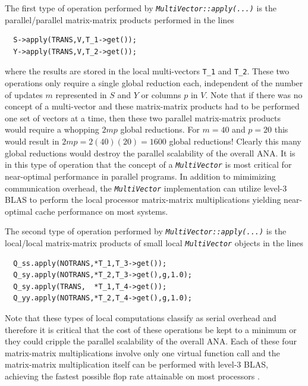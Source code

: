 The first type of operation performed by
\texttt{\textit{Multi\-Vector\-::apply(\-...)}} is the parallel/parallel
matrix-matrix products performed in the lines

{\scriptsize\begin{verbatim}
  S->apply(TRANS,V,T_1->get());
  Y->apply(TRANS,V,T_2->get());
\end{verbatim}}

{}\noindent{}where the results are stored in the local multi-vectors 
\texttt{T\_1} and \texttt{T\_2}.  These two operations only
require a single global reduction each, independent of the number of
updates $m$ represented in $S$ and $Y$ or columns $p$ in $V$.  Note
that if there was no concept of a multi-vector and these matrix-matrix
products had to be performed one set of vectors at a time, then these
two parallel matrix-matrix products would require a whopping $2 m p$
global reductions.  For $m = 40$ and $p = 20$ this would result in $2
m p = 2(40)(20) = 1600$ global reductions!  Clearly this many global
reductions would destroy the parallel scalability of the overall ANA.
It is in this type of operation that the concept of a
\texttt{\textit{Multi\-Vector}} is most critical for near-optimal
performance in parallel programs.  In addition to mimimizing
communication overhead, the \texttt{\textit{Multi\-Vector}}
implementation can utilize level-3 BLAS to perform the local processor
matrix-matrix multiplications yielding near-optimal cache performance
on most systems.

The second type of operation performed by
\texttt{\textit{Multi\-Vector\-::apply(\-...)}} is the local/local matrix-matrix
products of small local \texttt{\textit{Multi\-Vector}} objects in the
lines

{\scriptsize\begin{verbatim}
  Q_ss.apply(NOTRANS,*T_1,T_3->get());
  Q_sy.apply(NOTRANS,*T_2,T_3->get(),g,1.0);
  Q_sy.apply(TRANS,  *T_1,T_4->get());
  Q_yy.apply(NOTRANS,*T_2,T_4->get(),g,1.0);
\end{verbatim}}

{}\noindent{}Note that these types of local computations classify as serial
overhead and therefore it is critical that the cost of these
operations be kept to a minimum or they could cripple the parallel
scalability of the overall ANA.  Each of these four matrix-matrix
multiplications involve only one virtual function call and the
matrix-matrix multiplication itself can be performed with level-3
BLAS, achieving the fastest possible flop rate attainable on most
processors \cite{ref:demmel_1997}.

